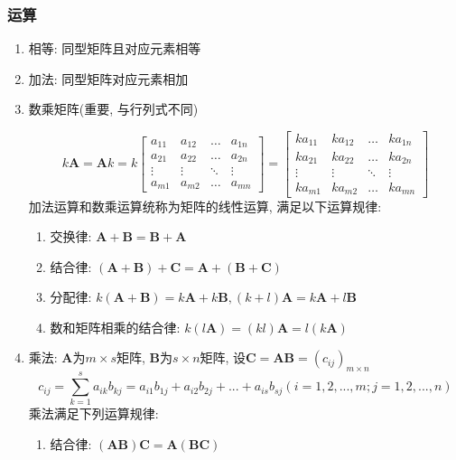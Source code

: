 \subsubsection{运算}
\begin{enumerate}
\item 相等: 同型矩阵且对应元素相等
\item 加法: 同型矩阵对应元素相加
\item 数乘矩阵(重要, 与行列式不同)\par
\begin{equation*}
k\bm{A} = \bm{A}k = k \begin{bmatrix}
                      a_{11}	& a_{12}  & \dots & a_{1n} \\
                      a_{21}	& a_{22} & \dots & a_{2n} \\
                      \vdots	& \vdots & \ddots & \vdots \\
                      a_{m1}	& a_{m2} & \dots & a_{mn}
\end{bmatrix} =
\begin{bmatrix}
ka_{11}	& ka_{12}  & \dots & ka_{1n} \\
ka_{21}	& ka_{22} & \dots & ka_{2n} \\
\vdots	& \vdots & \ddots & \vdots \\
ka_{m1}	& ka_{m2} & \dots & ka_{mn}
\end{bmatrix}
\end{equation*}
加法运算和数乘运算统称为矩阵的线性运算, 满足以下运算规律:
\begin{enumerate}
\item 交换律: $ \bm{A}+\bm{B}=\bm{B}+\bm{A} $
\item 结合律: $ (\bm{A}+\bm{B})+\bm{C}=\bm{A}+(\bm{B}+\bm{C}) $
\item 分配律: $ k(\bm{A}+\bm{B})=k\bm{A}+k\bm{B}, (k+l)\bm{A}=k\bm{A}+l\bm{B} $
\item 数和矩阵相乘的结合律: $ k(l\bm{A})=(kl)\bm{A}=l(k\bm{A}) $
\end{enumerate}
\item 乘法: $ \bm{A} $为$ m\times s $矩阵, $ \bm{B} $为$ s\times n $矩阵, 设$ \bm{C}=\bm{A}\bm{B}=(c_{ij})_{m\times n} $
\begin{equation*}
c_{ij}=\sum_{k=1}^{s}a_{ik}b_{kj}=a_{i1}b_{1j}+a_{i2}b_{2j}+...+a_{is}b_{sj}(i=1,2,...,m;j=1,2,...,n)
\end{equation*}
乘法满足下列运算规律:
\begin{enumerate}
\item 结合律: $ (\bm{A}\bm{B})\bm{C}=\bm{A}(\bm{B}\bm{C}) $

\end{enumerate}
\end{enumerate}
